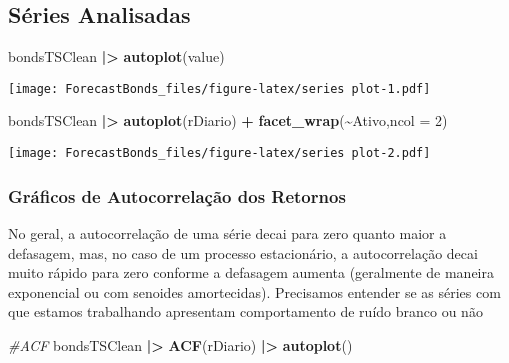 \documentclass[
]{article}
\newenvironment{Shaded}{\begin{snugshade}}{\end{snugshade}}
\newcommand{\AttributeTok}[1]{\textcolor[rgb]{0.13,0.29,0.53}{#1}}
\newcommand{\CommentTok}[1]{\textcolor[rgb]{0.56,0.35,0.01}{\textit{#1}}}
\newcommand{\DecValTok}[1]{\textcolor[rgb]{0.00,0.00,0.81}{#1}}
\newcommand{\FunctionTok}[1]{\textcolor[rgb]{0.13,0.29,0.53}{\textbf{#1}}}
\newcommand{\NormalTok}[1]{#1}
\newcommand{\SpecialCharTok}[1]{\textcolor[rgb]{0.81,0.36,0.00}{\textbf{#1}}}
\begin{document}
\hypertarget{suxe9ries-analisadas}{%
\subsection{Séries Analisadas}\label{suxe9ries-analisadas}}

\begin{Shaded}
\begin{Highlighting}[]
\NormalTok{bondsTSClean }\SpecialCharTok{|\textgreater{}} \FunctionTok{autoplot}\NormalTok{(value)}
\end{Highlighting}
\end{Shaded}

\texttt{[image: ForecastBonds\_files/figure-latex/series plot-1.pdf]}

\begin{Shaded}
\begin{Highlighting}[]
\NormalTok{bondsTSClean }\SpecialCharTok{|\textgreater{}} \FunctionTok{autoplot}\NormalTok{(rDiario) }\SpecialCharTok{+}
          \FunctionTok{facet\_wrap}\NormalTok{(}\SpecialCharTok{\textasciitilde{}}\NormalTok{Ativo,}\AttributeTok{ncol =} \DecValTok{2}\NormalTok{)}
\end{Highlighting}
\end{Shaded}

\texttt{[image: ForecastBonds\_files/figure-latex/series plot-2.pdf]}

\hypertarget{gruxe1ficos-de-autocorrelauxe7uxe3o-dos-retornos}{%
\subsubsection{Gráficos de Autocorrelação dos
Retornos}\label{gruxe1ficos-de-autocorrelauxe7uxe3o-dos-retornos}}

No geral, a autocorrelação de uma série decai para zero quanto maior a
defasagem, mas, no caso de um processo estacionário, a autocorrelação
decai muito rápido para zero conforme a defasagem aumenta (geralmente de
maneira exponencial ou com senoides amortecidas). Precisamos entender se
as séries com que estamos trabalhando apresentam comportamento de ruído
branco ou não

\begin{Shaded}
\begin{Highlighting}[]
\CommentTok{\#ACF}
\NormalTok{bondsTSClean  }\SpecialCharTok{|\textgreater{}}  \FunctionTok{ACF}\NormalTok{(rDiario) }\SpecialCharTok{|\textgreater{}} \FunctionTok{autoplot}\NormalTok{()}
\end{Highlighting}
\end{Shaded}
\end{document}
